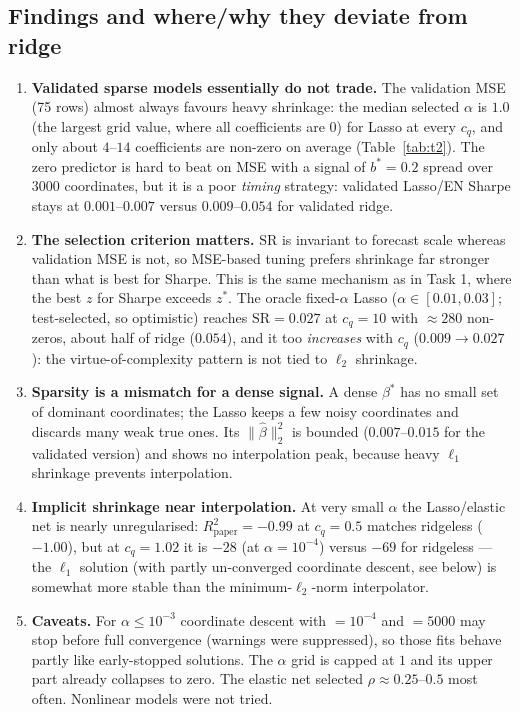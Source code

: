 \documentclass[11pt,a4paper]{article}
\newcommand{\code}[1]{\path{#1}}
\newcommand{\bh}{\widehat{\beta}}
\newcommand{\Rpaper}{R^2_{\mathrm{paper}}}
\newcommand{\SR}{\mathrm{SR}}
\begin{document}
\subsection{Findings and where/why they deviate from ridge}
\begin{enumerate}
\item \textbf{Validated sparse models essentially do not trade.} The validation MSE (75 rows) almost always favours heavy shrinkage: the median selected $\alpha$ is $1.0$ (the largest grid value, where all coefficients are $0$) for Lasso at every $c_q$, and only about $4$--$14$ coefficients are non-zero on average (Table~\ref{tab:t2}).
The zero predictor is hard to beat on MSE with a signal of $b^*=0.2$ spread over $3000$ coordinates, but it is a poor \emph{timing} strategy: validated Lasso/EN Sharpe stays at $0.001$--$0.007$ versus $0.009$--$0.054$ for validated ridge.
\item \textbf{The selection criterion matters.} $\SR$ is invariant to forecast scale whereas validation MSE is not, so MSE-based tuning prefers shrinkage far stronger than what is best for Sharpe. This is the same mechanism as in Task 1, where the best $z$ for Sharpe exceeds $z^*$.
The oracle fixed-$\alpha$ Lasso ($\alpha\in[0.01,0.03]$; test-selected, so optimistic) reaches $\SR=0.027$ at $c_q=10$ with $\approx280$ non-zeros, about half of ridge ($0.054$), and it too \emph{increases} with $c_q$ ($0.009\to0.027$): the virtue-of-complexity pattern is not tied to $\ell_2$ shrinkage.
\item \textbf{Sparsity is a mismatch for a dense signal.} A dense $\beta^*$ has no small set of dominant coordinates; the Lasso keeps a few noisy coordinates and discards many weak true ones. Its $\|\bh\|_2^2$ is bounded ($0.007$--$0.015$ for the validated version) and shows no interpolation peak, because heavy $\ell_1$ shrinkage prevents interpolation.
\item \textbf{Implicit shrinkage near interpolation.} At very small $\alpha$ the Lasso/elastic net is nearly unregularised: $\Rpaper=-0.99$ at $c_q=0.5$ matches ridgeless ($-1.00$), but at $c_q=1.02$ it is $-28$ (at $\alpha=10^{-4}$) versus $-69$ for ridgeless --- the $\ell_1$ solution (with partly un-converged coordinate descent, see below) is somewhat more stable than the minimum-$\ell_2$-norm interpolator.
\item \textbf{Caveats.} For $\alpha\le10^{-3}$ coordinate descent with \code{tol}$=10^{-4}$ and \code{max_iter}$=5000$ may stop before full convergence (warnings were suppressed), so those fits behave partly like early-stopped solutions. The $\alpha$ grid is capped at $1$ and its upper part already collapses to zero. The elastic net selected $\rho\approx0.25$--$0.5$ most often. Nonlinear models were not tried.
\end{enumerate}
\end{document}

